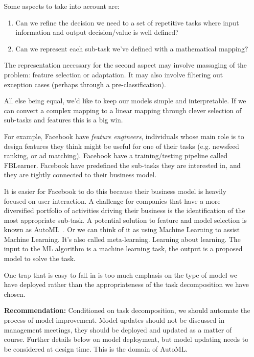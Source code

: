 \documentclass[a4paper]{caesar_book}
\begin{document}
Some aspects to take into account are:
\begin{enumerate}
    \item Can we refine the decision we need to a set of repetitive tasks where input information and output decision/value is well defined?
    \item Can we represent each sub-task we’ve defined with a mathematical mapping?
\end{enumerate}

The representation necessary for the second aspect may involve massaging of the problem: feature selection or adaptation. It may also involve filtering out exception cases (perhaps through a pre-classification).

All else being equal, we’d like to keep our models simple and interpretable. If we can convert a complex mapping to a linear mapping through clever selection of sub-tasks and features this is a big win.

For example, Facebook have \textit{feature engineers}, individuals whose main role is to design features they think might be useful for one of their tasks (e.g. newsfeed ranking, or ad matching). Facebook have a training/testing pipeline called FBLearner. Facebook have predefined the sub-tasks they are interested in, and they are tightly connected to their business model.

It is easier for Facebook to do this because their business model is heavily focused on user interaction. A challenge for companies that have a more diversified portfolio of activities driving their business is the identification of the most appropriate sub-task. A potential solution to feature and model selection is known as AutoML~. Or we can think of it as using Machine Learning to assist Machine Learning. It’s also called meta-learning. Learning about learning. The input to the ML algorithm is a machine learning task, the output is a proposed model to solve the task.

One trap that is easy to fall in is too much emphasis on the type of model we have deployed rather than the appropriateness of the task decomposition we have chosen.

\textbf{Recommendation:} Conditioned on task decomposition, we should automate the process of model improvement. Model updates should not be discussed in management meetings, they should be deployed and updated as a matter of course. Further details below on model deployment, but model updating needs to be considered at design time. This is the domain of AutoML.
\end{document}
